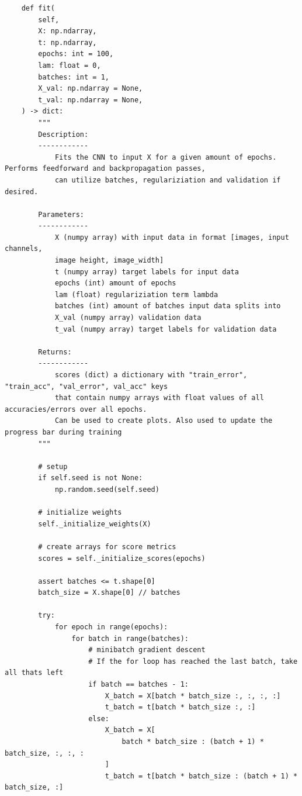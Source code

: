 \documentclass[%
oneside,                 %
final,                   %
10pt]{article}
\begin{document}
\begin{verbatim}
    def fit(
        self,
        X: np.ndarray,
        t: np.ndarray,
        epochs: int = 100,
        lam: float = 0,
        batches: int = 1,
        X_val: np.ndarray = None,
        t_val: np.ndarray = None,
    ) -> dict:
        """
        Description:
        ------------
            Fits the CNN to input X for a given amount of epochs. Performs feedforward and backpropagation passes,
            can utilize batches, regulariziation and validation if desired.

        Parameters:
        ------------
            X (numpy array) with input data in format [images, input channels,
            image height, image_width]
            t (numpy array) target labels for input data
            epochs (int) amount of epochs
            lam (float) regulariziation term lambda
            batches (int) amount of batches input data splits into
            X_val (numpy array) validation data
            t_val (numpy array) target labels for validation data

        Returns:
        ------------
            scores (dict) a dictionary with "train_error", "train_acc", "val_error", val_acc" keys
            that contain numpy arrays with float values of all accuracies/errors over all epochs.
            Can be used to create plots. Also used to update the progress bar during training
        """

        # setup
        if self.seed is not None:
            np.random.seed(self.seed)

        # initialize weights
        self._initialize_weights(X)

        # create arrays for score metrics
        scores = self._initialize_scores(epochs)

        assert batches <= t.shape[0]
        batch_size = X.shape[0] // batches

        try:
            for epoch in range(epochs):
                for batch in range(batches):
                    # minibatch gradient descent
                    # If the for loop has reached the last batch, take all thats left
                    if batch == batches - 1:
                        X_batch = X[batch * batch_size :, :, :, :]
                        t_batch = t[batch * batch_size :, :]
                    else:
                        X_batch = X[
                            batch * batch_size : (batch + 1) * batch_size, :, :, :
                        ]
                        t_batch = t[batch * batch_size : (batch + 1) * batch_size, :]


\end{verbatim}
\end{document}
